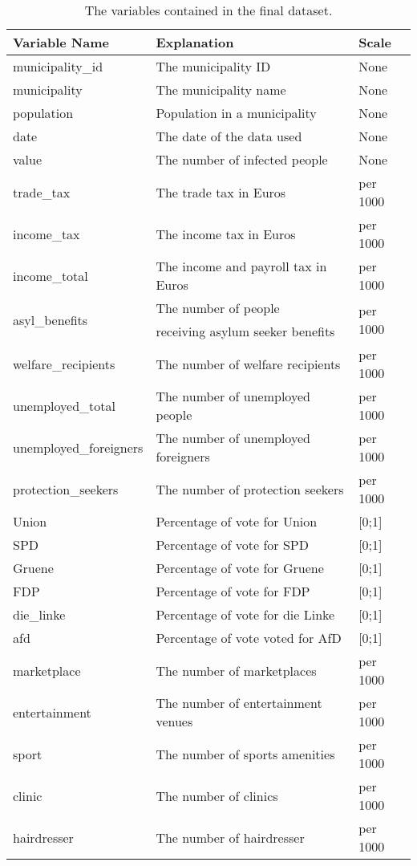 \begin{table}[H] 
\caption{The variables contained in the final dataset.\label{finalGermany}}
\begin{tabular}{l l l}
\toprule
\textbf{Variable Name}	& \textbf{Explanation}	& \textbf{Scale}\\
\midrule
municipality\_id & The municipality ID & None\\
municipality & The municipality name & None \\
population & Population in a municipality & None \\
date & The date of the data used & None\\
value & The number of infected people & None \\
trade\_tax & The trade tax in Euros & per 1000 \\
income\_tax & The income tax in Euros & per 1000 \\
income\_total & The income and payroll tax in Euros & per 1000 \\
\multirow{2}{*}{asyl\_benefits} & The number of people & \multirow{2}{*}{per 1000} \\
& receiving asylum seeker benefits \\
welfare\_recipients & The number of welfare recipients & per 1000 \\
unemployed\_total & The number of unemployed people & per 1000 \\
unemployed\_foreigners & The number of unemployed foreigners & per 1000 \\
protection\_seekers & The number of protection seekers & per 1000 \\
Union & Percentage of vote for Union & [0;1]\\
SPD & Percentage of vote for SPD & [0;1]\\
Gruene & Percentage of vote for Gruene & [0;1]\\
FDP & Percentage of vote for FDP & [0;1]\\
die\_linke & Percentage of vote for die Linke & [0;1]\\
afd & Percentage of vote voted for AfD & [0;1] \\
marketplace & The number of marketplaces & per 1000 \\
entertainment & The number of entertainment venues & per 1000 \\
sport & The number of sports amenities & per 1000 \\
clinic & The number of clinics & per 1000 \\
hairdresser & The number of hairdresser & per 1000 \\

\end{tabular}
\end{table}
